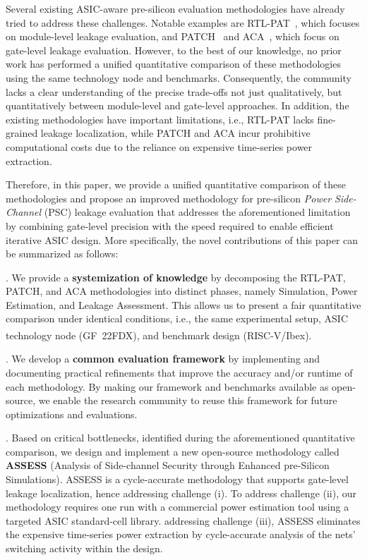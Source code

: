 \documentclass[sigconf]{acmart}
\newcommand{\methodname}{ASSESS}
\newcommand{\methoddis}{Analysis of Side-channel Security through Enhanced pre-Silicon Simulations}
\begin{document}
{Several existing ASIC-aware pre-silicon evaluation methodologies have already tried to address these challenges. 
Notable examples are RTL-PAT~\cite{RTL_PSC}, which focuses on module-level leakage evaluation, and PATCH~\cite{PATCH} and ACA~\cite{ACA}, which focus on gate-level leakage evaluation. However, to the best of our knowledge, no prior work has performed a unified quantitative comparison of these methodologies using the same technology node and benchmarks. Consequently, the community lacks a clear understanding of the precise trade-offs not just qualitatively, but quantitatively between module-level and gate-level approaches. 
In addition, the existing methodologies have important limitations, i.e., RTL-PAT lacks fine-grained leakage localization, while PATCH and ACA incur prohibitive computational costs due to the reliance on expensive time-series power extraction. 

Therefore, in this paper, we provide a unified quantitative comparison of these methodologies and propose an improved methodology for pre-silicon \emph{Power Side-Channel} (PSC) leakage evaluation that addresses the aforementioned limitation by  combining gate-level precision with the speed required to enable efficient iterative ASIC design. More specifically, the novel contributions of this paper can be summarized as follows:

. We provide a \textbf{systemization of knowledge} by decomposing the {RTL-PAT}, {PATCH}, and {ACA} methodologies into distinct phases, namely Simulation, Power Estimation, and Leakage Assessment. This allows us to present a fair quantitative comparison under identical conditions, i.e., the same experimental setup, ASIC technology node (\mbox{GF\textsuperscript{\textregistered}
22FDX}), and benchmark design (RISC-V/Ibex).

{}. We develop a \textbf{common evaluation framework} by implementing and documenting practical refinements that improve the accuracy and/or runtime of each methodology. By making our framework and benchmarks available as open-source, we enable the research community to reuse this framework for future optimizations and evaluations.

. Based on critical bottlenecks, identified during the aforementioned quantitative comparison, we design and implement a new open-source methodology called \textbf{\methodname{}} (\methoddis). \methodname{} is a cycle-accurate methodology that supports gate-level leakage localization, hence addressing challenge (i). To address challenge (ii), our methodology requires one run with a commercial power estimation tool using a targeted ASIC standard-cell library. addressing challenge (iii), ASSESS eliminates the expensive time-series power extraction by cycle-accurate analysis of the nets' switching activity within the  design.








}
\end{document}
